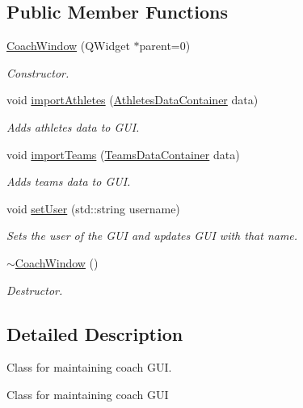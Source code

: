 \subsection*{Public Member Functions}
\begin{DoxyCompactItemize}
\item 
\mbox{\hyperlink{classCoachWindow_ad5fe46b8ca97449f3d3cb0c072b61cf7}{Coach\+Window}} (Q\+Widget $\ast$parent=0)
\begin{DoxyCompactList}\small\item\em Constructor. \end{DoxyCompactList}\item 
void \mbox{\hyperlink{classCoachWindow_a6ca2df6c1b3dc97435beb1ff0cfb33fa}{import\+Athletes}} (\mbox{\hyperlink{classAthletesDataContainer}{Athletes\+Data\+Container}} data)
\begin{DoxyCompactList}\small\item\em Adds athletes data to G\+UI. \end{DoxyCompactList}\item 
void \mbox{\hyperlink{classCoachWindow_af20eff5e696065c76f801f1aacea6322}{import\+Teams}} (\mbox{\hyperlink{classTeamsDataContainer}{Teams\+Data\+Container}} data)
\begin{DoxyCompactList}\small\item\em Adds teams data to G\+UI. \end{DoxyCompactList}\item 
void \mbox{\hyperlink{classCoachWindow_ac711fc6e1ae0ec1f53331faa6f3e2918}{set\+User}} (std\+::string username)
\begin{DoxyCompactList}\small\item\em Sets the user of the G\+UI and updates G\+UI with that name. \end{DoxyCompactList}\item 
\mbox{\hyperlink{classCoachWindow_a7ac9500ae70bf19813a9ceb04259dd17}{$\sim$\+Coach\+Window}} ()
\begin{DoxyCompactList}\small\item\em Destructor. \end{DoxyCompactList}\end{DoxyCompactItemize}


\subsection{Detailed Description}
Class for maintaining coach G\+UI. 

Class for maintaining coach G\+UI 


